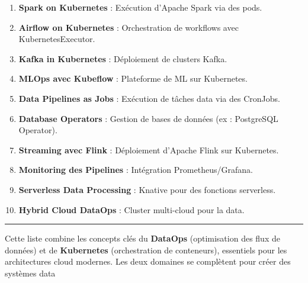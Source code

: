 \documentclass[
  letterpaper,
  DIV=11,
  numbers=noendperiod]{scrartcl}
\providecommand{\tightlist}{%
  \setlength{\itemsep}{0pt}\setlength{\parskip}{0pt}}\usepackage{longtable,booktabs,array}
\begin{document}
\begin{enumerate}
\def\labelenumi{\arabic{enumi}.}
\setcounter{enumi}{90}
\tightlist
\item
  \textbf{Spark on Kubernetes} : Exécution d'Apache Spark via des
  pods.\\
\item
  \textbf{Airflow on Kubernetes} : Orchestration de workflows avec
  KubernetesExecutor.\\
\item
  \textbf{Kafka in Kubernetes} : Déploiement de clusters Kafka.\\
\item
  \textbf{MLOps avec Kubeflow} : Plateforme de ML sur Kubernetes.\\
\item
  \textbf{Data Pipelines as Jobs} : Exécution de tâches data via des
  CronJobs.\\
\item
  \textbf{Database Operators} : Gestion de bases de données (ex :
  PostgreSQL Operator).\\
\item
  \textbf{Streaming avec Flink} : Déploiement d'Apache Flink sur
  Kubernetes.\\
\item
  \textbf{Monitoring des Pipelines} : Intégration Prometheus/Grafana.\\
\item
  \textbf{Serverless Data Processing} : Knative pour des fonctions
  serverless.\\
\item
  \textbf{Hybrid Cloud DataOps} : Cluster multi-cloud pour la data.
\end{enumerate}

\begin{center}\rule{0.5\linewidth}{0.5pt}\end{center}

Cette liste combine les concepts clés du \textbf{DataOps} (optimisation
des flux de données) et de \textbf{Kubernetes} (orchestration de
conteneurs), essentiels pour les architectures cloud modernes. Les deux
domaines se complètent pour créer des systèmes data
\end{document}

